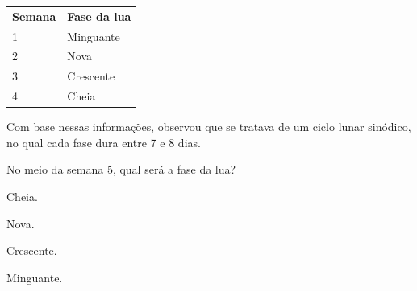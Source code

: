 \begin{longtable}[]{@{}ll@{}}
\toprule
\textbf{Semana} & \textbf{Fase da lua}\tabularnewline
1 & Minguante\tabularnewline
2 & Nova\tabularnewline
3 & Crescente\tabularnewline
4 & Cheia\tabularnewline
\bottomrule
\end{longtable}

Com base nessas informações, observou que se tratava de um ciclo lunar
sinódico, no qual cada fase dura entre 7 e 8 dias.

No meio da semana 5, qual será a fase da lua?

\begin{minipage}{.5\textwidth}
\begin{escolha}
\item Cheia.

\item Nova.

\item Crescente.

\item Minguante.
\end{escolha}
\end{minipage}

\pagebreak